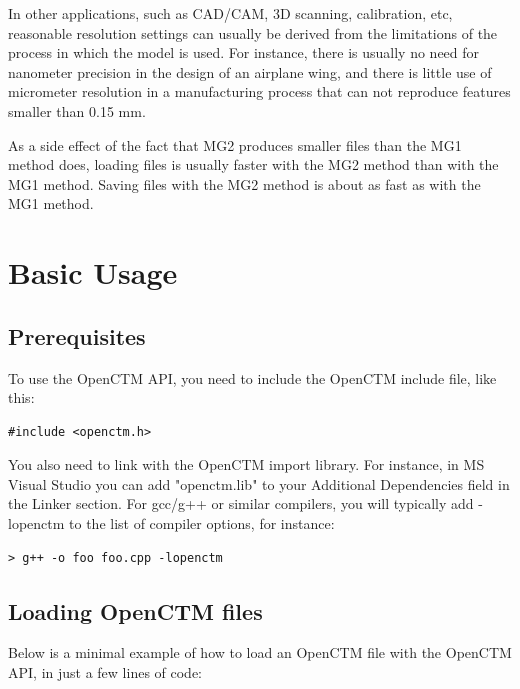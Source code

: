 In other applications, such as CAD/CAM, 3D scanning, calibration, etc,
reasonable resolution settings can usually be derived from the limitations
of the process in which the model is used. For instance, there is usually no
need for nanometer precision in the design of an airplane wing, and there
is little use of micrometer resolution in a manufacturing process that can
not reproduce features smaller than 0.15 mm.

As a side effect of the fact that MG2 produces smaller files than the MG1
method does, loading files is usually faster with the MG2 method than with
the MG1 method. Saving files with the MG2 method is about as fast as with
the MG1 method.




\chapter{Basic Usage}

\section{Prerequisites}
To use the OpenCTM API, you need to include the OpenCTM include file, like this:

\begin{lstlisting}
#include <openctm.h>
\end{lstlisting}

You also need to link with the OpenCTM import library. For instance, in MS
Visual Studio you can add "openctm.lib" to your Additional Dependencies field
in the Linker section. For gcc/g++ or similar compilers, you will typically
add -lopenctm to the list of compiler options, for instance:

\begin{lstlisting}
> g++ -o foo foo.cpp -lopenctm
\end{lstlisting}


\section{Loading OpenCTM files}
Below is a minimal example of how to load an OpenCTM file with the OpenCTM API,
in just a few lines of code:

